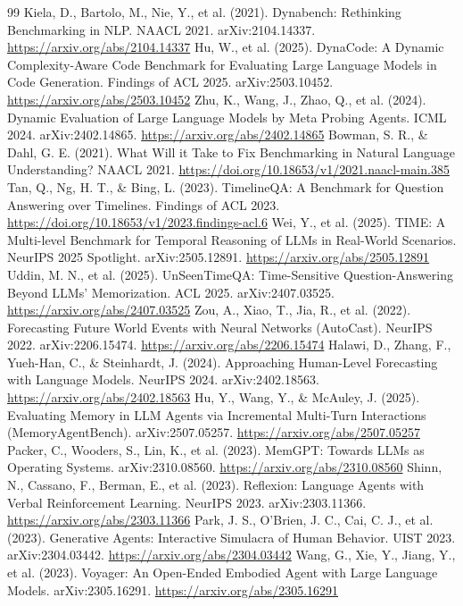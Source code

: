 \begin{thebibliography}{99}
 Kiela, D., Bartolo, M., Nie, Y., et al. (2021). Dynabench: Rethinking Benchmarking in NLP. NAACL 2021. arXiv:2104.14337. \url{https://arxiv.org/abs/2104.14337}
 Hu, W., et al. (2025). DynaCode: A Dynamic Complexity-Aware Code Benchmark for Evaluating Large Language Models in Code Generation. Findings of ACL 2025. arXiv:2503.10452. \url{https://arxiv.org/abs/2503.10452}
 Zhu, K., Wang, J., Zhao, Q., et al. (2024). Dynamic Evaluation of Large Language Models by Meta Probing Agents. ICML 2024. arXiv:2402.14865. \url{https://arxiv.org/abs/2402.14865}
 Bowman, S. R., \& Dahl, G. E. (2021). What Will it Take to Fix Benchmarking in Natural Language Understanding? NAACL 2021. \url{https://doi.org/10.18653/v1/2021.naacl-main.385}
 Tan, Q., Ng, H. T., \& Bing, L. (2023). TimelineQA: A Benchmark for Question Answering over Timelines. Findings of ACL 2023. \url{https://doi.org/10.18653/v1/2023.findings-acl.6}
 Wei, Y., et al. (2025). TIME: A Multi-level Benchmark for Temporal Reasoning of LLMs in Real-World Scenarios. NeurIPS 2025 Spotlight. arXiv:2505.12891. \url{https://arxiv.org/abs/2505.12891}
 Uddin, M. N., et al. (2025). UnSeenTimeQA: Time-Sensitive Question-Answering Beyond LLMs' Memorization. ACL 2025. arXiv:2407.03525. \url{https://arxiv.org/abs/2407.03525}
 Zou, A., Xiao, T., Jia, R., et al. (2022). Forecasting Future World Events with Neural Networks (AutoCast). NeurIPS 2022. arXiv:2206.15474. \url{https://arxiv.org/abs/2206.15474}
 Halawi, D., Zhang, F., Yueh-Han, C., \& Steinhardt, J. (2024). Approaching Human-Level Forecasting with Language Models. NeurIPS 2024. arXiv:2402.18563. \url{https://arxiv.org/abs/2402.18563}
 Hu, Y., Wang, Y., \& McAuley, J. (2025). Evaluating Memory in LLM Agents via Incremental Multi-Turn Interactions (MemoryAgentBench). arXiv:2507.05257. \url{https://arxiv.org/abs/2507.05257}
 Packer, C., Wooders, S., Lin, K., et al. (2023). MemGPT: Towards LLMs as Operating Systems. arXiv:2310.08560. \url{https://arxiv.org/abs/2310.08560}
 Shinn, N., Cassano, F., Berman, E., et al. (2023). Reflexion: Language Agents with Verbal Reinforcement Learning. NeurIPS 2023. arXiv:2303.11366. \url{https://arxiv.org/abs/2303.11366}
 Park, J. S., O'Brien, J. C., Cai, C. J., et al. (2023). Generative Agents: Interactive Simulacra of Human Behavior. UIST 2023. arXiv:2304.03442. \url{https://arxiv.org/abs/2304.03442}
 Wang, G., Xie, Y., Jiang, Y., et al. (2023). Voyager: An Open-Ended Embodied Agent with Large Language Models. arXiv:2305.16291. \url{https://arxiv.org/abs/2305.16291}

\end{thebibliography}
